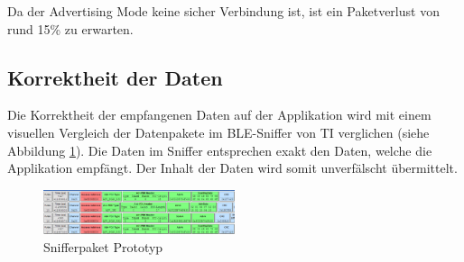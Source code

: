 Da der Advertising Mode keine sicher Verbindung ist, ist ein Paketverlust von rund 15\thinspace\% zu erwarten.


\subsection{Korrektheit der Daten}

Die Korrektheit der empfangenen Daten auf der Applikation wird mit einem visuellen Vergleich der Datenpakete im BLE-Sniffer von TI verglichen (siehe Abbildung \ref{sniffer}).  Die Daten im Sniffer entsprechen exakt den Daten, welche die Applikation empfängt. Der Inhalt der Daten wird somit unverfälscht übermittelt.



\begin{figure}[ht]
    \includegraphics[width=0.5\textwidth]{4Resultate/imag/sniffer.png} 
    \caption{Snifferpaket Prototyp}
    \label{sniffer}
\end{figure}









